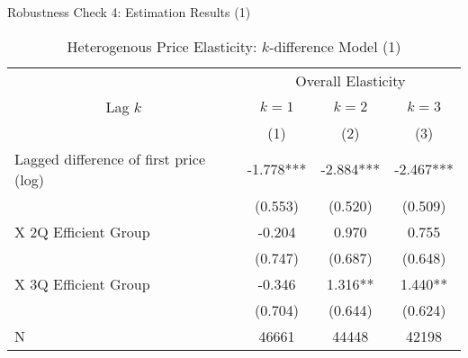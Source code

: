 \documentclass[
  ignorenonframetext,
]{beamer}
\begin{document}
\begin{frame}{Robustness Check 4: Estimation Results (1)}
\protect\hypertarget{robustness-check-4-estimation-results-1}{}
\begin{table}

\caption{\label{tab:kableHeterokDiffElasticitySlide1}Heterogenous Price Elasticity: $k$-difference Model (1)}
\centering
\fontsize{8}{10}\selectfont
\begin{tabular}[t]{lccc}
\toprule
\multicolumn{1}{c}{ } & \multicolumn{3}{c}{Overall Elasticity} \\
\cmidrule(l{3pt}r{3pt}){2-4}
\multicolumn{1}{c}{Lag $k$} & \multicolumn{1}{c}{$k = 1$} & \multicolumn{1}{c}{$k = 2$} & \multicolumn{1}{c}{$k = 3$} \\
\cmidrule(l{3pt}r{3pt}){1-1} \cmidrule(l{3pt}r{3pt}){2-2} \cmidrule(l{3pt}r{3pt}){3-3} \cmidrule(l{3pt}r{3pt}){4-4}
 & (1) & (2) & (3)\\
\midrule
Lagged difference of first price (log) & -1.778*** & -2.884*** & -2.467***\\
 & (0.553) & (0.520) & (0.509)\\
\hspace{1em}X 2Q Efficient Group & -0.204 & 0.970 & 0.755\\
 & (0.747) & (0.687) & (0.648)\\
\hspace{1em}X 3Q Efficient Group & -0.346 & 1.316** & 1.440**\\
 & (0.704) & (0.644) & (0.624)\\
N & 46661 & 44448 & 42198\\
\bottomrule
\end{tabular}
\end{table}
\end{frame}
\end{document}
